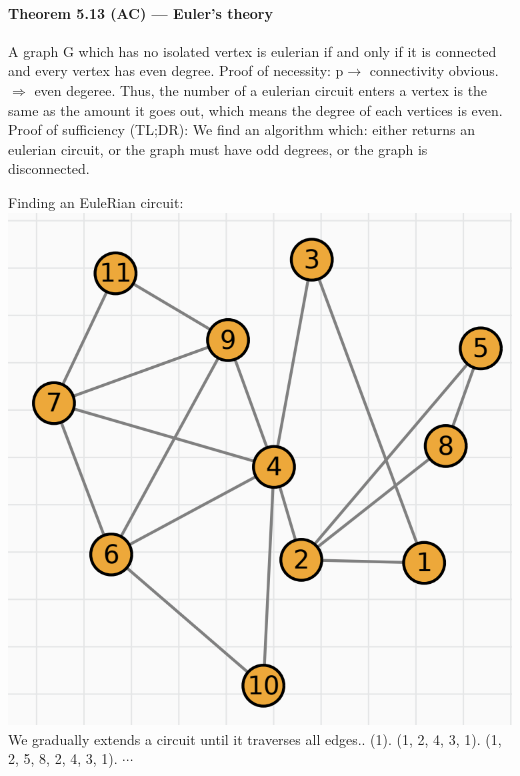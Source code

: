 \documentclass{article}
\begin{document}
\paragraph{Theorem 5.13 (AC) — Euler’s theory}A graph G which has no isolated vertex is eulerian if and only if it is connected and every vertex has even degree.\newline
Proof of necessity:\newline
p$\longrightarrow$ connectivity obvious. $\Longrightarrow$ even degeree. Thus, the number of a eulerian circuit enters a vertex is the same as the amount it goes out, which means the degree of each vertices is  even.\newline
Proof of sufficiency (TL;DR):\newline
We find an algorithm which:\newline
    either returns an eulerian circuit,\newline
    or the graph must have odd degrees,\newline
    or the graph is disconnected.\newline
\par Finding an EuleRian circuit:\newline
\includegraphics{0066}\newline
We gradually extends a circuit until it traverses all edges.. (1). (1, 2, 4, 3, 1). (1, 2, 5, 8, 2, 4, 3, 1). $\cdots$\newline
\end{document}
